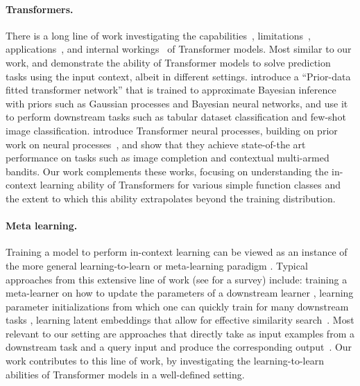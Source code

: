 \paragraph{Transformers.} There is a long line of work investigating the capabilities~\citep{vaswani2017attention,dehghani2018universal,yun2019transformers,perez2019turing,yao2021self,bhattamishra2020computational,zhang2022unveiling}, limitations~\citep{hahn2020theoretical, bhattamishra2020ability}, applications~\citep{lu2021pretrained,dosovitskiy2020image, parmar2018image}, and internal workings~\citep{elhage2021mathematical,snell2021approximating,weiss2021thinking,edelman2022inductive,olsson2022context} of Transformer models.
Most similar to our work, \citet{muller2021transformers} and \citet{nguyen2022transformer} demonstrate the ability of Transformer models to solve prediction tasks using the input context, albeit in different settings. \citet{muller2021transformers} introduce a ``Prior-data fitted transformer network'' that is trained to approximate Bayesian inference with priors such as Gaussian processes and Bayesian neural networks,  and use it to perform downstream tasks such as tabular dataset classification and few-shot image classification. \citet{nguyen2022transformer} introduce Transformer neural processes, building on prior work on neural processes~\citep{garnelo2018neural, garnelo2018conditional, kim2019attentive}, and show that they achieve state-of-the art performance on tasks such as image completion and contextual multi-armed bandits.
Our work complements these works, focusing on understanding the in-context learning ability of Transformers for various simple function classes and the extent to which this ability extrapolates beyond the training distribution.

\paragraph{Meta learning.} Training a model to perform in-context learning
can be viewed as an instance of the more general learning-to-learn or meta-learning paradigm \citep{schmidhuber1987evolutionary,naik1992meta,thrun2012learning}.
Typical approaches from this extensive line of work (see \citep{hospedales2020meta} for a survey) include:
training a meta-learner on how to update the parameters of a downstream learner \citep{bengio1995optimization, li2016learning}, learning parameter initializations from which one can quickly train for many downstream tasks \citep{finn2017model, ravi2016optimization},
learning latent embeddings that allow for effective similarity search~\citep{snell2017prototypical}.
Most relevant to our setting are approaches that directly  take as input examples from a downstream task and a query input and produce the corresponding output~\citep{hochreiter2001learning,mishra2018simple, santoro2016meta, garnelo2018neural, garnelo2018conditional,kirsch2021meta}.
Our work contributes to this line of work, by investigating the learning-to-learn abilities of Transformer models in a well-defined setting.

